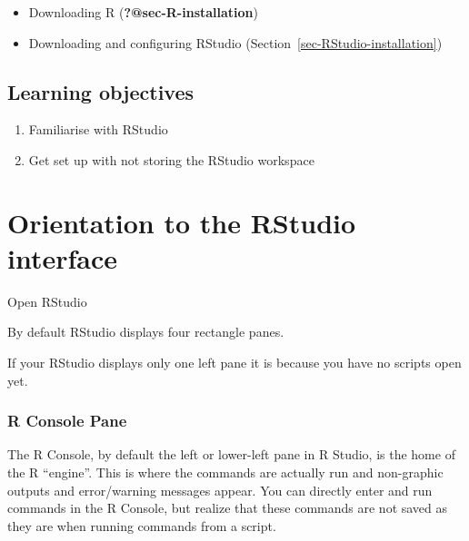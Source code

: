\documentclass[
  letterpaper,
  DIV=11,
  numbers=noendperiod,
  oneside]{scrreprt}
\providecommand{\tightlist}{%
  \setlength{\itemsep}{0pt}\setlength{\parskip}{0pt}}\usepackage{longtable,booktabs,array}
\begin{document}
\begin{itemize}
\tightlist
\item
  Downloading R (\textbf{?@sec-R-installation})
\item
  Downloading and configuring RStudio
  (Section~\ref{sec-RStudio-installation})
\end{itemize}

\hypertarget{learning-objectives-2}{%
\subsection{Learning objectives}\label{learning-objectives-2}}

\begin{enumerate}
\def\labelenumi{\arabic{enumi}.}
\tightlist
\item
  Familiarise with RStudio
\item
  Get set up with not storing the RStudio workspace
\end{enumerate}

\hypertarget{orientation-to-the-rstudio-interface}{%
\section{Orientation to the RStudio
interface}\label{orientation-to-the-rstudio-interface}}

Open RStudio

By default RStudio displays four rectangle panes.

\begin{tcolorbox}[enhanced jigsaw, colbacktitle=quarto-callout-tip-color!10!white, titlerule=0mm, breakable, opacityback=0, opacitybacktitle=0.6, left=2mm, coltitle=black, colback=white, title=\textcolor{quarto-callout-tip-color}{\faLightbulb}\hspace{0.5em}{Tip}, rightrule=.15mm, colframe=quarto-callout-tip-color-frame, toprule=.15mm, bottomtitle=1mm, toptitle=1mm, arc=.35mm, bottomrule=.15mm, leftrule=.75mm]
If your RStudio displays only one left pane it is because you have no
scripts open yet.
\end{tcolorbox}

\hypertarget{r-console-pane}{%
\subsubsection{R Console Pane}\label{r-console-pane}}

The R Console, by default the left or lower-left pane in R Studio, is
the home of the R ``engine''. This is where the commands are actually
run and non-graphic outputs and error/warning messages appear. You can
directly enter and run commands in the R Console, but realize that these
commands are not saved as they are when running commands from a script.
\end{document}
